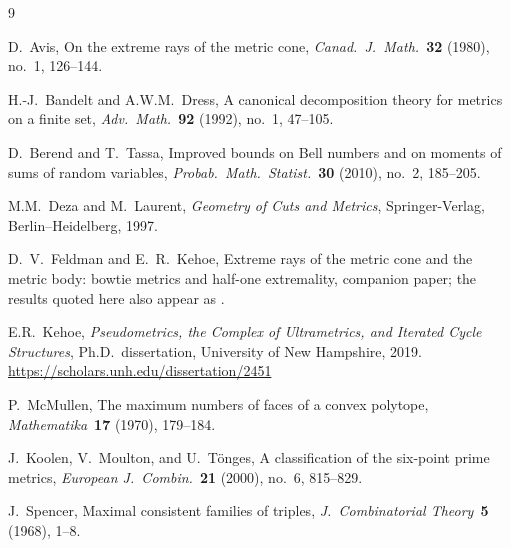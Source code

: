 \documentclass[11pt]{article}
\theoremstyle{definition}
\theoremstyle{remark}
\begin{document}
\begin{thebibliography}{9}

D.~Avis, On the extreme rays of the metric cone,
\textit{Canad.\ J.\ Math.}~\textbf{32} (1980), no.~1, 126--144.

H.-J.~Bandelt and A.W.M.~Dress, A canonical decomposition theory for metrics on a finite
set, \textit{Adv.\ Math.}~\textbf{92} (1992), no.~1, 47--105.

D.~Berend and T.~Tassa, Improved bounds on Bell numbers and on moments of sums of random
variables, \textit{Probab.\ Math.\ Statist.}~\textbf{30} (2010), no.~2, 185--205.

M.M.~Deza and M.~Laurent, \textit{Geometry of Cuts and Metrics}, Springer-Verlag,
Berlin--Heidelberg, 1997.

D.~V.~Feldman and E.~R.~Kehoe, Extreme rays of the metric cone and the metric body: bowtie
metrics and half-one extremality, companion paper; the results quoted here also appear as
\cite[Ch.~2--4]{Kehoe19}.

E.R.~Kehoe, \textit{Pseudometrics, the Complex of Ultrametrics, and Iterated Cycle
Structures}, Ph.D.\ dissertation, University of New Hampshire, 2019.
\url{https://scholars.unh.edu/dissertation/2451}

P.~McMullen, The maximum numbers of faces of a convex polytope,
\textit{Mathematika}~\textbf{17} (1970), 179--184.

J.~Koolen, V.~Moulton, and U.~T\"onges, A classification of the six-point prime metrics,
\textit{European J.\ Combin.}~\textbf{21} (2000), no.~6, 815--829.

J.~Spencer, Maximal consistent families of triples, \textit{J.\ Combinatorial
Theory}~\textbf{5} (1968), 1--8.

\end{thebibliography}
\end{document}
